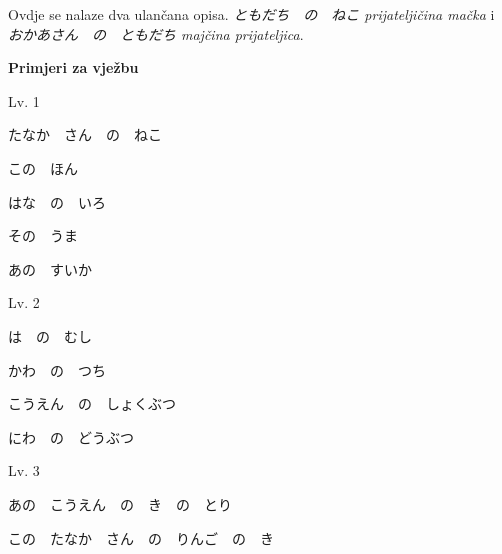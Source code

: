 	Ovdje se nalaze dva ulančana opisa.  \textit{ともだち　の　ねこ prijateljičina mačka} i \textit{おかあさん　の　ともだち majčina prijateljica}.
	
	\begin{reibun}
	\end{reibun}

	\normalsize \textbf{Primjeri za vježbu}
	
	\begin{mondai}{Lv. 1}
		\item たなか　さん　の　ねこ
		\item この　ほん
		\item はな　の　いろ
		\item その　うま
		\item あの　すいか
	\end{mondai}
	
	\begin{mondai}{Lv. 2}
		\item は　の　むし
		\item かわ　の　つち
		\item こうえん　の　しょくぶつ
		\item にわ　の　どうぶつ
	\end{mondai}
	
	\begin{mondai}{Lv. 3}
		\item あの　こうえん　の　き　の　とり
		\item この　たなか　さん　の　りんご　の　き
	\end{mondai}
	




